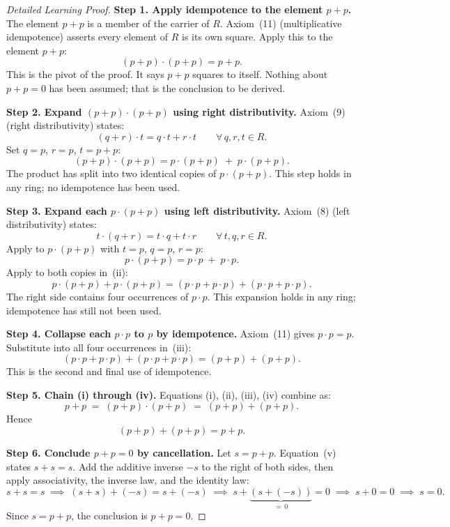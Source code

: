 \begin{proof}[Detailed Learning Proof]
\LRAProofBodyStart

\textbf{Step 1. Apply idempotence to the element $p + p$.}
The element $p + p$ is a member of the carrier of $R$.
Axiom~(11) (multiplicative idempotence) asserts every element
of $R$ is its own square.
Apply this to the element $p + p$:
\[
(p + p) \cdot (p + p) = p + p. \tag{i}
\]
This is the pivot of the proof.
It says $p + p$ squares to itself.
Nothing about $p + p = 0$ has been assumed;
that is the conclusion to be derived.

\textbf{Step 2. Expand $(p+p)\cdot(p+p)$ using right distributivity.}
Axiom~(9) (right distributivity) states:
\[
(q + r) \cdot t = q \cdot t + r \cdot t
\qquad \forall\, q, r, t \in R.
\]
Set $q = p$, $r = p$, $t = p + p$:
\[
(p + p) \cdot (p + p) = p \cdot (p + p) \;+\; p \cdot (p + p). \tag{ii}
\]
The product has split into two identical copies of $p \cdot (p+p)$.
This step holds in any ring; no idempotence has been used.

\textbf{Step 3. Expand each $p\cdot(p+p)$ using left distributivity.}
Axiom~(8) (left distributivity) states:
\[
t \cdot (q + r) = t \cdot q + t \cdot r
\qquad \forall\, t, q, r \in R.
\]
Apply to $p \cdot (p + p)$ with $t = p$, $q = p$, $r = p$:
\[
p \cdot (p + p) = p \cdot p \;+\; p \cdot p.
\]
Apply to both copies in~(ii):
\[
p \cdot (p+p) + p \cdot (p+p)
= (p \cdot p + p \cdot p) + (p \cdot p + p \cdot p). \tag{iii}
\]
The right side contains four occurrences of $p \cdot p$.
This expansion holds in any ring; idempotence has still not
been used.

\textbf{Step 4. Collapse each $p \cdot p$ to $p$ by idempotence.}
Axiom~(11) gives $p \cdot p = p$.
Substitute into all four occurrences in~(iii):
\[
(p \cdot p + p \cdot p) + (p \cdot p + p \cdot p)
= (p + p) + (p + p). \tag{iv}
\]
This is the second and final use of idempotence.

\textbf{Step 5. Chain (i) through (iv).}
Equations (i), (ii), (iii), (iv) combine as:
\[
p + p
\;=\; (p+p)\cdot(p+p)
\;=\; (p+p)+(p+p).
\]
Hence
\[
(p+p) + (p+p) = p+p. \tag{v}
\]

\textbf{Step 6. Conclude $p + p = 0$ by cancellation.}
Let $s = p + p$.
Equation~(v) states $s + s = s$.
Add the additive inverse $-s$ to the right of both sides,
then apply associativity, the inverse law, and the identity law:
\[
s + s = s
\;\implies\; (s + s) + (-s) = s + (-s)
\;\implies\; s + \underbrace{(s + (-s))}_{=\,0} = 0
\;\implies\; s + 0 = 0
\;\implies\; s = 0.
\]
Since $s = p + p$, the conclusion is $p + p = 0$.
\end{proof}

